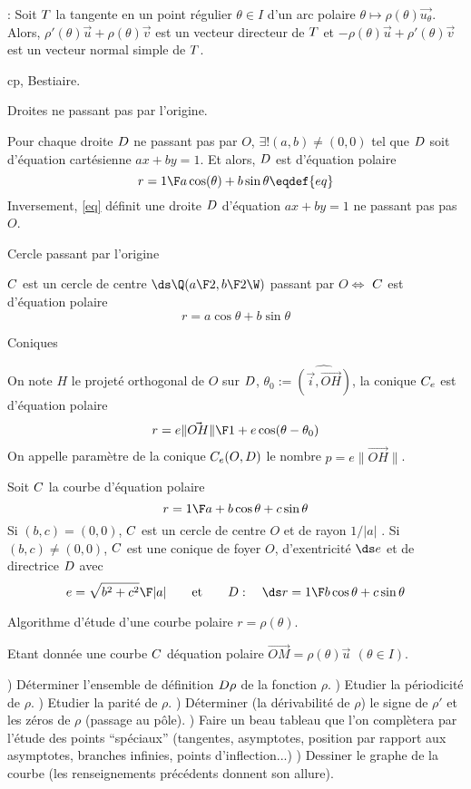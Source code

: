 \Remarque : Soit $\sc T$ la tangente en un point régulier $\theta\in I$ 
d'un arc polaire $\theta\mapsto\rho(\theta)\vec{u_{\theta}}$. Alors, 
$\rho'(\theta)\vec u+\rho(\theta)\vec v$ est un vecteur directeur de $\sc T$ et 
$-\rho(\theta)\vec u+\rho'(\theta)\vec v$ est un vecteur normal simple de $\sc T$. 
\bigskip

\Subsection cp, Bestiaire. 
\bigskip

\Concept Droites ne passant pas par l'origine. 

Pour chaque droite $\sc D$ ne passant pas par $O$, $\exists!(a,b)\neq (0,0)$ tel que 
$\sc D$ soit d'équation cartésienne $ax+by=1$. Et alors, 
$\sc D$ est d'équation polaire 
$$
r={1\F a\cos(\theta)+b\sin\theta}\eqdef{eq}
$$
Inversement, \eqref{eq} définit une droite $\sc D$ d'équation $ax+by=1$ ne passant pas pas $O$. 
\bigskip

\Concept Cercle passant par l'origine

\Propriete $\sc C$ est un cercle de centre $\ds\Q({a\F2},{b\F2}\W)$ passant par $O\Longleftrightarrow$ 
$\sc C$ est d'équation polaire 
$$
r=a\cos\theta+b\sin\theta
$$

\Concept Coniques 

On note $H$ le projeté orthogonal de $O$ sur $\sc D$, 
$\theta_0:=\widehat{(\vec i,\vec{OH})}$, la conique $\sc C_e$ est d'équation polaire 
$$
r={e\|\vec {OH}\|\F1+e\cos(\theta-\theta_0)}
$$
On appelle paramètre de la conique $\sc C_e(O,\sc D)$ le nombre $p=e\|\vec{OH}\|$. 
\bigskip

Soit $\sc C$ la courbe d'équation polaire 
$$
r={1\F a+b\cos\theta+c\sin\theta}
$$ 
Si $(b,c)=(0,0)$, $\sc C$ est un cercle de centre $O$ et de rayon $1/|a|$ . \pn
Si $(b,c)\neq(0,0)$, $\sc C$ est une conique de foyer $O$, d'exentricité $\ds e$ 
et de directrice $\sc D$ avec 
$$
e={\sqrt{b^2+c^2}\F|a|}\qquad\mbox{et}\qquad \sc D:\quad \ds r={1\F b\cos\theta+c\sin\theta}
$$

\Concept Algorithme d'étude d'une courbe polaire $r=\rho(\theta)$. 

Etant donnée une courbe $\sc C$ déquation polaire $\vec{OM}=\rho(\theta)\vec u\ \,(\theta\in I)$.  
\bigskip

) Déterminer l'ensemble de définition $\sc D\rho$ de la fonction $\rho$. ) Etudier la périodicité de $\rho$. ) Etudier la parité de $\rho$. ) Déterminer (la dérivabilité de $\rho$) le signe de $\rho'$ 
et les zéros de $\rho$ (passage au pôle). ) Faire un beau tableau que l'on complètera par l'étude des points ``spéciaux'' 
(tangentes, asymptotes, position par rapport aux asymptotes, branches infinies, 
points d'inflection...)
) Dessiner le graphe de la courbe (les renseignements précédents donnent son allure). 
\bigskip


